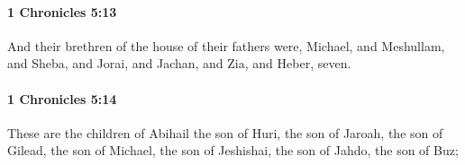 		\paragraph{1 Chronicles 5:13} %
			\label{1CHRONICLES-5-13}

			And their brethren of the house of their fathers were, Michael, and Meshullam, and Sheba, and Jorai, and Jachan, and Zia, and Heber, seven.


		\paragraph{1 Chronicles 5:14} %
			\label{1CHRONICLES-5-14}

			These are the children of Abihail the son of Huri, the son of Jaroah, the son of Gilead, the son of Michael, the son of Jeshishai, the son of Jahdo, the son of Buz;


